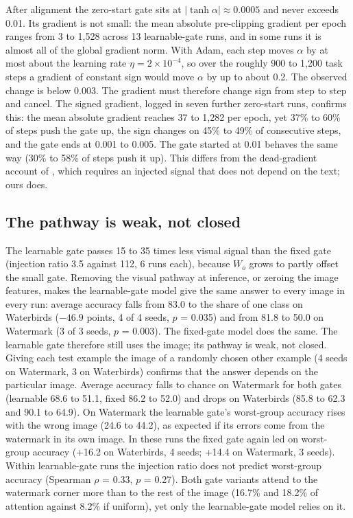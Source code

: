 After alignment the zero-start gate sits at \(|\tanh\alpha| \approx 0.0005\) and never exceeds 0.01. Its gradient is
not small: the mean absolute pre-clipping gradient per epoch ranges from 3 to 1,528 across 13 learnable-gate runs,
and in some runs it is almost all of the global gradient norm. With Adam, each step moves \(\alpha\) by at most about
the learning rate \(\eta = 2 \times 10^{-4}\), so over the roughly 900 to 1,200 task steps a gradient of constant sign
would move \(\alpha\) by up to about 0.2. The observed change is below 0.003. The gradient must therefore change sign
from step to step and cancel. The signed gradient, logged in seven further zero-start runs, confirms this: the mean
absolute gradient reaches 37 to 1,282 per epoch, yet 37\% to 60\% of steps push the gate up, the sign changes on 45\%
to 49\% of consecutive steps, and the gate ends at 0.001 to 0.005. The gate started at 0.01 behaves the same way
(30\% to 58\% of steps push it up). This differs from the dead-gradient account of \citep{farazi2026gate}, which requires an
injected signal that does not depend on the text; ours does.

\subsection{The pathway is weak, not closed}

The learnable gate passes 15 to 35 times less visual signal than the fixed gate (injection ratio 3.5 against 112,
6 runs each), because \(W_o\) grows to partly offset the small gate. Removing the visual pathway at inference, or
zeroing the image features, makes the learnable-gate model give the same answer to every image in every run:
average accuracy falls from 83.0 to the share of one class on Waterbirds (\(-46.9\) points, 4 of 4 seeds, \(p\) = 0.035)
and from 81.8 to 50.0 on Watermark (3 of 3 seeds, \(p\) = 0.003). The fixed-gate model does the same. The learnable
gate therefore still uses the image; its pathway is weak, not closed. Giving each test example the image of a
randomly chosen other example (4 seeds on Watermark, 3 on Waterbirds) confirms that the answer depends on the
particular image. Average accuracy falls to chance on Watermark for both gates (learnable 68.6 to 51.1, fixed 86.2 to
52.0) and drops on Waterbirds (85.8 to 62.3 and 90.1 to 64.9). On Watermark the learnable gate's worst-group accuracy
rises with the wrong image (24.6 to 44.2), as expected if its errors come from the watermark in its own image. In these runs the fixed gate again led on
worst-group accuracy (+16.2 on Waterbirds, 4 seeds; +14.4 on Watermark, 3 seeds). Within learnable-gate runs the injection ratio does not predict
worst-group accuracy (Spearman \(\rho\) = 0.33, \(p\) = 0.27). Both gate variants attend to the watermark corner more
than to the rest of the image (16.7\% and 18.2\% of attention against 8.2\% if uniform), yet only the learnable-gate
model relies on it.

